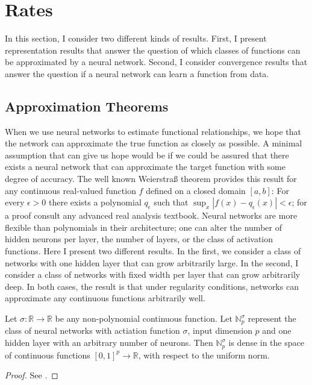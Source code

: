 \section{Rates}
\label{seq:rates}

In this section, I consider two different kinds of results. First, I present
representation results that answer the question of which classes of functions can be
approximated by a neural network. Second, I consider convergence results that answer
the question if a neural network can learn a function from data.

\subsection{Approximation Theorems}

When we use neural networks to estimate functional relationships, we hope that the
network can approximate the true function as closely as possible. A minimal assumption
that can give us hope would be if we could be assured that there exists a neural network
that can approximate the target function with some degree of accuracy. The well known
Weierstra{\ss} theorem provides this result for any continuous real-valued function $f$
defined on a closed domain $[a, b]$: For every $\epsilon > 0$ there exists a polynomial
$q_\epsilon$ such that $\sup_{x} |f(x) - q_\epsilon(x)| < \epsilon$; for a proof consult
any advanced real analysis textbook. Neural networks are more flexible than polynomials
in their architecture; one can alter the number of hidden neurons per layer, the number
of layers, or the class of activation functions. Here I present two different results.
In the first, we consider a class of networks with one hidden layer that can grow
arbitrarily large. In the second, I consider a class of networks with fixed width per
layer that can grow arbitrarily deep. In both cases, the result is that under regularity
conditions, networks can approximate any continuous functions arbitrarily well.

\begin{theorem}
   Let $\sigma : \mathbb{R} \to \mathbb{R}$ be any non-polynomial continuous function.
   Let $\mathbb{N}_p^\sigma$ represent the class of neural networks with actiation
   function $\sigma$, input dimension $p$ and one hidden layer with an arbitrary number
   of neurons. Then $\mathbb{N}_p^\sigma$ is dense in the space of continuous functions
   $[0, 1]^p \to \mathbb{R}$, with respect to the uniform norm.
\end{theorem}
\begin{proof}
    See \cite{Cybenko.1989,Hornik.1991,Pinkus.1999}.
\end{proof}

